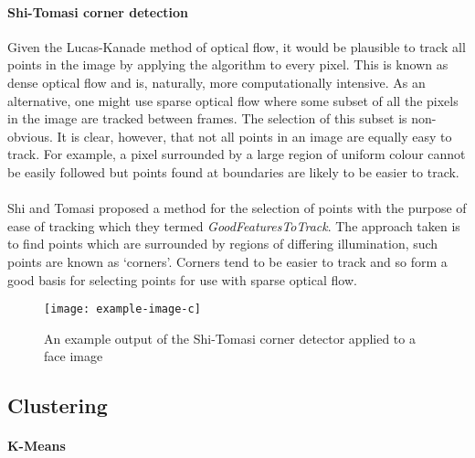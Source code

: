 \paragraph{Shi-Tomasi corner detection}
Given the Lucas-Kanade method of optical flow, it would be plausible to track all points in the image by applying the algorithm to every pixel. This is known as dense optical flow and is, naturally, more computationally 
intensive. As an alternative, one might use sparse optical flow where some subset of all the pixels in the image are tracked between frames. 
The selection of this subset is non-obvious. It is clear, however, that not all points in an image are equally easy to track. For example, a pixel surrounded by a large region of uniform colour cannot be easily followed but points
found at boundaries are likely to be easier to track. 
\\\\
Shi and Tomasi \cite{ShiTomasi} proposed a method for the selection of points with the purpose of ease of tracking which they termed \textit{GoodFeaturesToTrack}. 
The approach taken is to find points which are surrounded by regions of differing illumination, such points are known as `corners'. Corners tend to be easier to track
and so form a good basis for selecting points for use with sparse optical flow.
\begin{figure}[H]
    \texttt{[image: example-image-c]}
   \caption{An example output of the Shi-Tomasi corner detector applied to a face image} 
\end{figure}

\subsection{Clustering}

\paragraph{K-Means}

